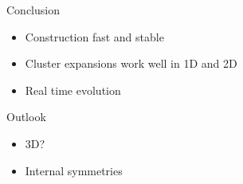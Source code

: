 \begin{frame}{Conclusion}
    \begin{itemize}
        \item Construction fast and stable
        \item Cluster expansions work well in 1D and 2D
        \item Real time evolution
    \end{itemize}
\end{frame}

\begin{frame}{Outlook}
    \begin{itemize}
        \item 3D?
        \item Internal symmetries
    \end{itemize}
\end{frame}